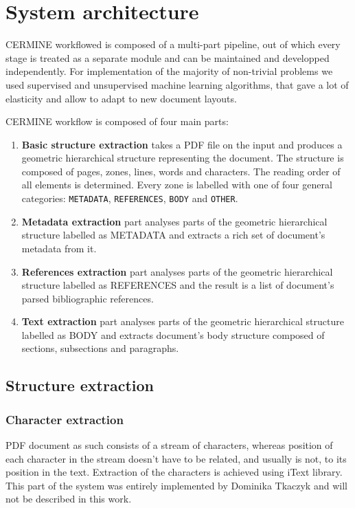 \chapter{System architecture}
CERMINE workflowed is composed of a multi-part pipeline, out of which every stage is treated as a separate module and can be maintained and developped independently. For implementation of the majority of non-trivial problems we used supervised and unsupervised machine learning algorithms, that gave a lot of elasticity and allow to adapt to new document layouts.

CERMINE workflow is composed of four main parts:
\begin{enumerate}
    \item \textbf{Basic structure extraction} takes a PDF file on the input and produces a geometric hierarchical structure representing the document. The structure is composed of pages, zones, lines, words and characters. The reading order of all elements is determined. Every zone is labelled with one of four general categories: \verb+METADATA+, \verb+REFERENCES+, \verb+BODY+ and \verb+OTHER+.
    \item \textbf{Metadata extraction} part analyses parts of the geometric hierarchical structure labelled as METADATA and extracts a rich set of document's metadata from it.
    \item \textbf{References extraction} part analyses parts of the geometric hierarchical structure labelled as REFERENCES and the result is a list of document's parsed bibliographic references.
    \item \textbf{Text extraction} part analyses parts of the geometric hierarchical structure labelled as BODY and extracts document's body structure composed of sections, subsections and paragraphs. 
\end{enumerate}
\section{Structure extraction}
\subsection{Character extraction}\label{sec:character_extraction}
PDF document as such consists of a stream of characters, whereas position of each character in the stream doesn't have to be related, and usually is not, to its position in the text. Extraction of the characters is achieved using iText library. This part of the system was entirely implemented by Dominika Tkaczyk and will not be described in this work.
